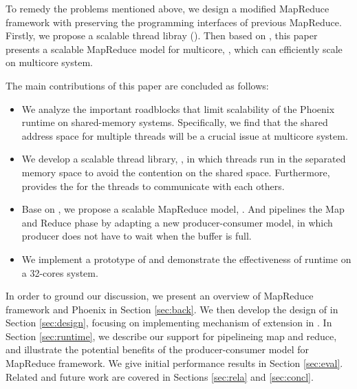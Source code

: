 
To remedy the problems mentioned above, we design a modified MapReduce framework with preserving the programming interfaces of previous MapReduce.
Firstly, we propose a scalable thread libray (\myth).
Then based on \myth, this paper presents a scalable MapReduce model for multicore, \myds, which can efficiently scale on multicore system.

The main contributions of this paper are concluded as follows:
\begin{itemize}
  \item We analyze the important roadblocks that limit scalability of the Phoenix runtime on shared-memory systems. Specifically, we find that the shared address space for multiple threads will be a crucial issue at multicore system.
  
  \item We develop a scalable thread library, \myth, in which threads run in  the separated memory space to avoid the contention on the shared space. Furthermore, \myth provides the  for the threads to communicate with each others. 

  \item Base on \myth, we propose a scalable MapReduce model, \myds.
  And \myds pipelines the Map and Reduce phase by adapting a new producer-consumer model, in which producer does not have to wait when the buffer is full. 

  \item We implement a prototype of \myth and demonstrate the effectiveness of \myds runtime on a 32-cores system. 
\end{itemize}

In order to ground our discussion, we present an overview of MapReduce framework and Phoenix in Section \ref{sec:back}. 
We then develop the design of \myth in Section \ref{sec:design}, focusing on implementing mechanism of extension in \myth. 
In Section \ref{sec:runtime}, we describe our support for pipelineing map and reduce, and illustrate the potential benefits of the producer-consumer model for MapReduce framework.
We give initial performance results in Section \ref{sec:eval}. 
Related and future work are covered in Sections \ref{sec:rela} and \ref{sec:concl}.

